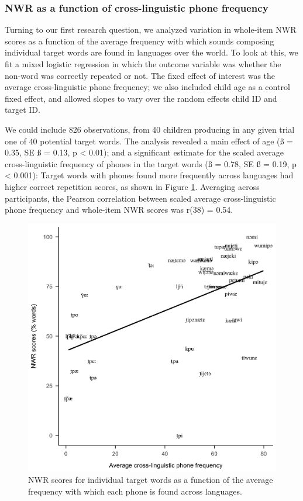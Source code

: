 \documentclass[english,,man,floatsintext]{apa6}
\begin{document}
\hypertarget{nwr-as-a-function-of-cross-linguistic-phone-frequency}{%
\subsubsection{NWR as a function of cross-linguistic phone frequency}\label{nwr-as-a-function-of-cross-linguistic-phone-frequency}}

Turning to our first research question, we analyzed variation in whole-item NWR scores as a function of the average frequency with which sounds composing individual target words are found in languages over the world. To look at this, we fit a mixed logistic regression in which the outcome variable was whether the non-word was correctly repeated or not. The fixed effect of interest was the average cross-linguistic phone frequency; we also included child age as a control fixed effect, and allowed slopes to vary over the random effects child ID and target ID.

We could include 826 observations, from 40 children producing in any given trial one of 40 potential target words. The analysis revealed a main effect of age (ß = 0.35, SE ß = 0.13, p \textless{} 0.01); and a significant estimate for the scaled average cross-linguistic frequency of phones in the target words (ß = 0.78, SE ß = 0.19, p \textless{} 0.001): Target words with phones found more frequently across languages had higher correct repetition scores, as shown in Figure \ref{fig:fig-xling-freq}. Averaging across participants, the Pearson correlation between scaled average cross-linguistic phone frequency and whole-item NWR scores was r(38) = 0.54.

\begin{figure}[!t]

{\centering \includegraphics[width=0.65\linewidth]{nwr.by.freq.ITEM} 

}

\caption{NWR scores for individual target words as a function of the average frequency with which each phone is found across languages.}\label{fig:fig-xling-freq}
\end{figure}
\end{document}
